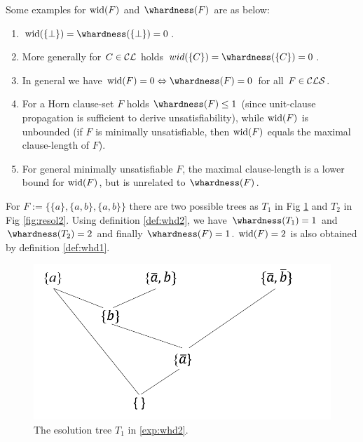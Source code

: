 \documentclass[12pt]{book}
\begin{document}
\begin{examp}\label{exp:whd1}
      Some examples for $\operatorname{wid}(F)$ and $\whardness(F)$ are as below:
	    \begin{enumerate}
              \item $\wid(\set{\bot}) = \whardness(\set{\bot}) = 0$.
			  \item More generally for $C \in \mathcal{CL}$ holds $wid(\{C\}) = \whardness(\{C\}) = 0$.
			  \item In general we have $\wid(F) = 0 \Leftrightarrow \whardness(F) = 0$ for all $F \in \mathcal{CLS}$.
			  \item For a Horn clause-set $F$ holds $\whardness(F) \leq 1$ (since unit-clause propagation is sufficient to derive unsatisfiability), 
			  while $\operatorname{wid}(F)$ is unbounded (if $F$ is minimally unsatisfiable, then $\operatorname{wid}(F)$ equals the maximal clause-length of $F$).
			  \item For general minimally unsatisfiable $F$, the maximal clause-length is a lower bound for $\operatorname{wid}(F)$, but is unrelated to 
			  $\whardness(F)$.
      	\end{enumerate}		  
\end{examp}

\begin{examp}\label{exp:whd2}
      For $F := \{\{a\}, \{a, b\}, \{a, b\}\}$ there are two possible trees as $T_1$ in Fig \ref{fig:whd2} and $T_2$ in Fig \ref{fig:resol2}.   
	  Using definition \ref{def:whd2}, we have $\whardness(T_1) = 1$ and $\whardness(T_2) = 2$ and finally $\whardness(F) = 1$. $\operatorname{wid}(F) = 2$ is also 
	  obtained by definition \ref{def:whd1}.
	  \begin{figure}
      \begin{center}
      \includegraphics[scale =0.6]{whd1.png}
      \caption{The esolution tree $T_1$ in \ref{exp:whd2}.}
	  \label{fig:whd2}
      \end{center}
      \end{figure}
\end{examp}
\end{document}
